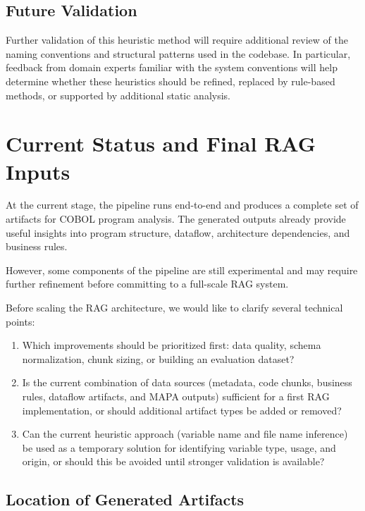 \documentclass[11pt]{article}
\begin{document}
\subsection*{Future Validation}

Further validation of this heuristic method will require additional review of the naming conventions and structural patterns used in the codebase. In particular, feedback from domain experts familiar with the system conventions will help determine whether these heuristics should be refined, replaced by rule-based methods, or supported by additional static analysis.


\section{Current Status and Final RAG Inputs}
\label{sec:current_status}

At the current stage, the pipeline runs end-to-end and produces a complete set of artifacts for COBOL program analysis. The generated outputs already provide useful insights into program structure, dataflow, architecture dependencies, and business rules.

However, some components of the pipeline are still experimental and may require further refinement before committing to a full-scale RAG system.

Before scaling the RAG architecture, we would like to clarify several technical points:

\begin{enumerate}
\item Which improvements should be prioritized first: data quality, schema normalization, chunk sizing, or building an evaluation dataset?
\item Is the current combination of data sources (metadata, code chunks, business rules, dataflow artifacts, and MAPA outputs) sufficient for a first RAG implementation, or should additional artifact types be added or removed?
\item Can the current heuristic approach (variable name and file name inference) be used as a temporary solution for identifying variable type, usage, and origin, or should this be avoided until stronger validation is available?
\end{enumerate}

\subsection*{Location of Generated Artifacts}
\end{document}
